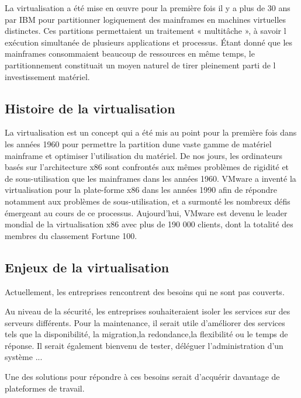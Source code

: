 La virtualisation a été mise en œuvre pour la première fois il y
a plus de 30 ans par IBM pour partitionner logiquement des mainframes
en machines virtuelles distinctes. Ces partitions permettaient un
traitement « multitâche », à savoir l exécution simultanée de plusieurs applications et processus. Étant donné que les mainframes consommaient beaucoup de ressources en même temps, le partitionnement constituait un moyen naturel de tirer pleinement parti de l investissement matériel.


\subsection{Histoire de la virtualisation}

La virtualisation est un concept qui a été mis au point pour la première fois dans les années 1960 pour permettre la partition dune vaste gamme de matériel mainframe et optimiser l'utilisation du matériel. De nos jours, les ordinateurs basés sur l'architecture x86 sont confrontés aux mêmes problèmes de rigidité et de sous-utilisation que les mainframes dans les années 1960. VMware a inventé la virtualisation pour la plate-forme x86 dans les années 1990 afin de répondre notamment aux problèmes de sous-utilisation, et a surmonté les nombreux défis émergeant au cours de ce processus. Aujourd'hui, VMware est devenu le leader mondial de la virtualisation x86 avec plus de 190 000 clients, dont la totalité des membres du classement Fortune 100.

\subsection{Enjeux de la virtualisation}

Actuellement, les entreprises rencontrent des besoins qui ne sont
pas couverts.

Au niveau de la sécurité, les entreprises souhaiteraient isoler les
services sur des serveurs différents. Pour la maintenance, il serait
utile d'améliorer des services tels que la disponibilité, la migration,la redondance,la flexibilité ou le temps de réponse. Il serait également bienvenu de tester, déléguer l'administration d'un système ...


Une des solutions pour répondre à ces besoins serait d'acquérir davantage de plateformes de travail.



